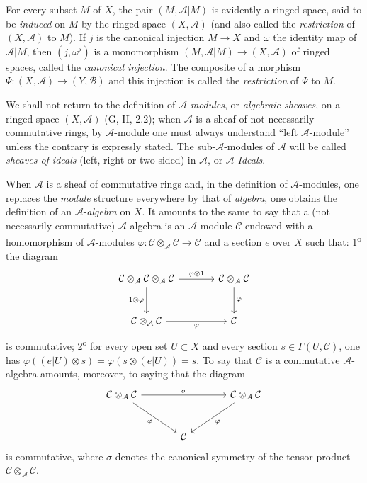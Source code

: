 \begin{env}[4.1.2]
\label{0.4.1.2}
For every subset $M$ of $X$, the pair $(M,\mathcal{A}|M)$ is evidently a
ringed space, said to be \emph{induced} on $M$ by the ringed space
$(X,\mathcal{A})$ (and also called the \emph{restriction} of
$(X,\mathcal{A})$ to $M$). If $j$ is the canonical injection $M\to X$ and
$\omega$ the identity map of $\mathcal{A}|M$, then $(j,\omega^\flat)$ is a
monomorphism $(M,\mathcal{A}|M)\to(X,\mathcal{A})$ of ringed spaces, called
the \emph{canonical injection}. The composite of a morphism
$\Psi:(X,\mathcal{A})\to(Y,\mathcal{B})$ and this injection is called the
\emph{restriction} of $\Psi$ to $M$.
\end{env}

\begin{env}[4.1.3]
\label{0.4.1.3}
We shall not return to the definition of $\mathcal{A}$-\emph{modules}, or
\emph{algebraic sheaves}, on a ringed space $(X,\mathcal{A})$
(G, II, 2.2); when $\mathcal{A}$ is a sheaf of not necessarily
commutative rings, by $\mathcal{A}$-module one must always
understand ``left $\mathcal{A}$-module'' unless the contrary is
expressly stated. The sub-$\mathcal{A}$-modules of $\mathcal{A}$ will be called
\emph{sheaves of ideals} (left, right or two-sided) in $\mathcal{A}$, or
$\mathcal{A}$-\emph{Ideals}.

When $\mathcal{A}$ is a sheaf of commutative rings and, in the
definition of $\mathcal{A}$-modules, one replaces the \emph{module} structure
everywhere by that of \emph{algebra}, one obtains the definition of an
$\mathcal{A}$-\emph{algebra} on $X$. It amounts to the same to say that a
(not necessarily commutative) $\mathcal{A}$-algebra is an
$\mathcal{A}$-module $\mathcal{C}$ endowed with a homomorphism of
$\mathcal{A}$-modules
$\varphi:\mathcal{C}\otimes_{\mathcal{A}}\mathcal{C}\to\mathcal{C}$ and
a section $e$ over $X$ such that: 1\textsuperscript{o} the diagram
\[
\begin{tikzcd}[column sep=large,row sep=large]
\mathcal{C}\otimes_{\mathcal{A}}\mathcal{C}\otimes_{\mathcal{A}}\mathcal{C}
  \arrow[r,"\varphi\otimes 1"]
  \arrow[d,"1\otimes\varphi"']
&
\mathcal{C}\otimes_{\mathcal{A}}\mathcal{C}
  \arrow[d,"\varphi"]
\\
\mathcal{C}\otimes_{\mathcal{A}}\mathcal{C}
  \arrow[r,"\varphi"']
&
\mathcal{C}
\end{tikzcd}
\]
is commutative; 2\textsuperscript{o} for every open set $U\subset X$ and every section
$s\in\Gamma(U,\mathcal{C})$, one has
$\varphi((e|U)\otimes s)=\varphi(s\otimes(e|U))=s$. To say that
$\mathcal{C}$ is a commutative $\mathcal{A}$-algebra amounts, moreover, to
saying that the diagram
\[
\begin{tikzcd}[column sep=large,row sep=large]
\mathcal{C}\otimes_{\mathcal{A}}\mathcal{C}
  \arrow[rr,"\sigma"]
  \arrow[dr,"\varphi"']
&&
\mathcal{C}\otimes_{\mathcal{A}}\mathcal{C}
  \arrow[dl,"\varphi"]
\\
& \mathcal{C} &
\end{tikzcd}
\]
is commutative, where $\sigma$ denotes the canonical symmetry of the tensor product
$\mathcal{C}\otimes_{\mathcal{A}}\mathcal{C}$.


\end{env}
